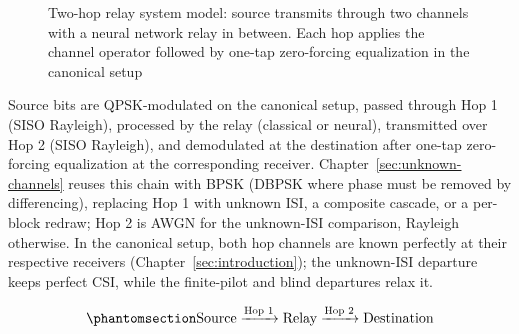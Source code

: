 \begin{figure}[htbp]
\centering
{}
\caption[Two-hop relay system model]{Two-hop relay system model: source transmits through two channels with a neural network relay in between. Each hop applies the channel operator followed by one-tap zero-forcing equalization in the canonical setup}
\label{fig:relay-system-simple}
\end{figure}

Source bits are QPSK-modulated on the canonical setup, passed through Hop 1 (SISO Rayleigh), processed by the relay (classical or neural), transmitted over Hop 2 (SISO Rayleigh), and demodulated at the destination after one-tap zero-forcing equalization at the corresponding receiver. Chapter~\ref{sec:unknown-channels} reuses this chain with BPSK (DBPSK where phase must be removed by differencing), replacing Hop 1 with unknown ISI, a composite cascade, or a per-block redraw; Hop 2 is AWGN for the unknown-ISI comparison, Rayleigh otherwise. In the canonical setup, both hop channels are known perfectly at their respective receivers (Chapter~\ref{sec:introduction}); the unknown-ISI departure keeps perfect CSI, while the finite-pilot and blind departures relax it.

\begin{equation}\protect\phantomsection\label{eq:two-hop-system}{\text{Source} \xrightarrow{\text{Hop 1}} \text{Relay} \xrightarrow{\text{Hop 2}} \text{Destination}
}\end{equation}

